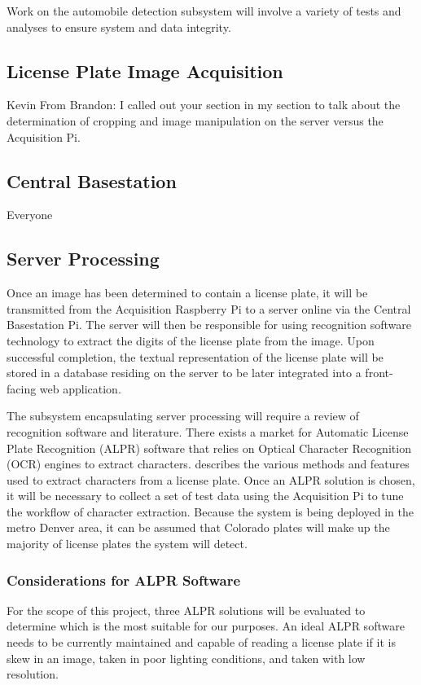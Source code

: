 \documentclass[11pt, oneside, fullpage, doublespace]{article}
\begin{document}
Work on the automobile detection subsystem will involve a variety of tests and analyses to ensure system and data integrity.


\subsection{License Plate Image Acquisition}
Kevin
From Brandon: I called out your section in my section to talk about the determination of cropping and image manipulation on the server versus the Acquisition Pi.


\subsection{Central Basestation}
Everyone


\subsection{Server Processing}
Once an image has been determined to contain a license plate, it will be transmitted from the Acquisition Raspberry Pi to a server online via the Central Basestation Pi. The server will then be responsible for using recognition software technology to extract the digits of the license plate from the image. Upon successful completion, the textual representation of the license plate will be stored in a database residing on the server to be later integrated into a front-facing web application.

The subsystem encapsulating server processing will require a review of recognition software and literature. There exists a market for Automatic License Plate Recognition (ALPR) software that relies on Optical Character Recognition (OCR) engines to extract characters. \cite{du2013} describes the various methods and features used to extract characters from a license plate. Once an ALPR solution is chosen, it will be necessary to collect a set of test data using the Acquisition Pi to tune the workflow of character extraction. Because the system is being deployed in the metro Denver area, it can be assumed that Colorado plates will make up the majority of license plates the system will detect.

\subsubsection{Considerations for ALPR Software}
For the scope of this project, three ALPR solutions will be evaluated to determine which is the most suitable for our purposes. An ideal ALPR software needs to be currently maintained and capable of reading a license plate if it is skew in an image, taken in poor lighting conditions, and taken with low resolution.
\end{document}
